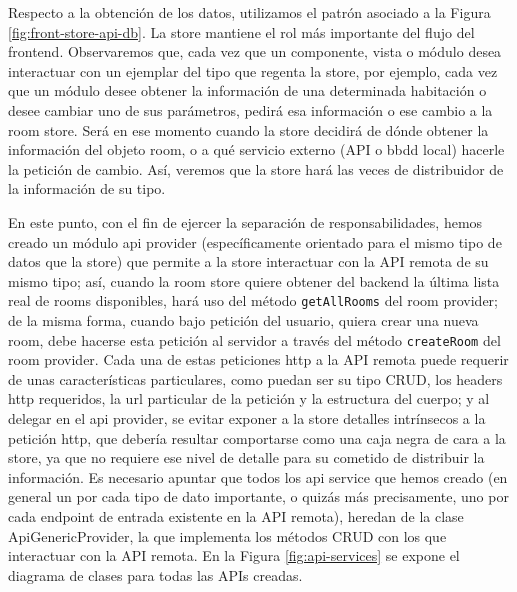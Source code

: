 Respecto a la obtención de los datos, utilizamos el patrón asociado a la Figura \ref{fig:front-store-api-db}. La store mantiene el rol más importante del flujo del frontend. Observaremos que, cada vez que un componente, vista o módulo desea interactuar con un ejemplar del tipo que regenta la store, por ejemplo, cada vez que un módulo desee obtener la información de una determinada habitación o desee cambiar uno de sus parámetros, pedirá esa información o ese cambio a la room store. Será en ese momento cuando la store decidirá de dónde obtener la información del objeto room, o a qué servicio externo (API o \gls{bbdd} local) hacerle la petición de cambio. Así, veremos que la store hará las veces de distribuidor de la información de su tipo.

\vspace{1cm}

En este punto, con el fin de ejercer la separación de responsabilidades, hemos creado un módulo api provider (específicamente orientado para el mismo tipo de datos que la store) que permite a la store interactuar con la API remota de su mismo tipo; así, cuando la room store quiere obtener del backend la última lista real de rooms disponibles, hará uso del método \verb|getAllRooms| del room provider; de la misma forma, cuando bajo petición del usuario, quiera crear una nueva room, debe hacerse esta petición al servidor a través del método \verb|createRoom| del room provider. Cada una de estas peticiones http a la API remota puede requerir de unas características particulares, como puedan ser su tipo CRUD, los headers http requeridos, la url particular de la petición y la estructura del cuerpo; y al delegar en el api provider, se evitar exponer a la store detalles intrínsecos a la petición http, que debería resultar comportarse como una caja negra de cara a la store, ya que no requiere ese nivel de detalle para su cometido de distribuir la información. 
Es necesario apuntar que todos los api service que hemos creado (en general un por cada tipo de dato importante, o quizás más precisamente, uno por cada endpoint de entrada existente en la API remota), heredan de la clase ApiGenericProvider, la que implementa los métodos CRUD con los que interactuar con la API remota. En la Figura \ref{fig:api-services} se expone el diagrama de clases para todas las APIs creadas.

